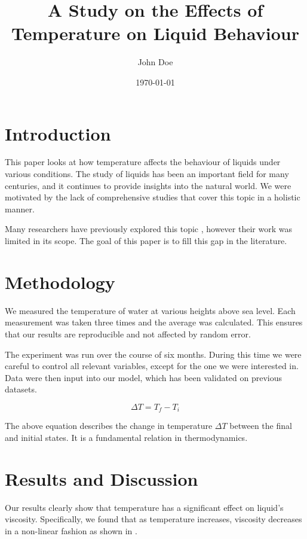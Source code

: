 \documentclass{article}
\title{A Study on the Effects of Temperature on Liquid Behaviour}
\author{John Doe}
\date{\today}
\begin{document}
\maketitle

\section{Introduction}

This paper looks at how temperature affects the behaviour of liquids under various conditions.
The study of liquids has been an important field for many centuries, and it continues to
provide insights into the natural world. We were motivated by the lack of comprehensive
studies that cover this topic in a holistic manner.

Many researchers have previously explored this topic \cite{smith2020}, however their work was
limited in its scope. The goal of this paper is to fill this gap in the literature.

\section{Methodology}

We measured the temperature of water at various heights above sea level. Each measurement was
taken three times and the average was calculated. This ensures that our results are reproducible
and not affected by random error.

The experiment was run over the course of six months. During this time we were careful to
control all relevant variables, except for the one we were interested in. Data were then
input into our model, which has been validated on previous datasets.

\begin{equation}
    \Delta T = T_f - T_i
\end{equation}

The above equation describes the change in temperature $\Delta T$ between the final and
initial states. It is a fundamental relation in thermodynamics.

\section{Results and Discussion}

Our results clearly show that temperature has a significant effect on liquid's viscosity.
Specifically, we found that as temperature increases, viscosity decreases in a non-linear
fashion as shown in \cite{jones2019}.
\end{document}
